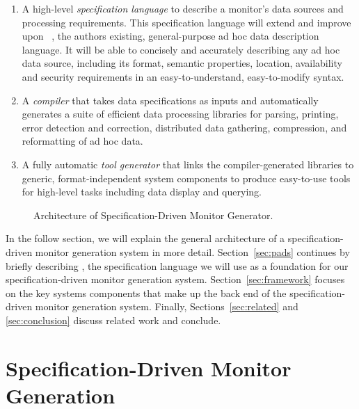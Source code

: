 \documentclass{sigplanconf}
\begin{document}
\begin{enumerate}

\item A high-level {\em specification language} to describe a monitor's
data sources and processing requirements.  
This specification language will extend and improve upon
\pads{}~\cite{fisher+:pads,fisher+:700,mandelbaum+:padsml}, the authors
existing, general-purpose ad hoc data description language.  
It will be able to
concisely and accurately describing any ad hoc data source,
including its format, semantic properties, location,
availability and security requirements in an easy-to-understand, easy-to-modify syntax.

\item A {\em compiler} that takes data specifications as inputs and
automatically generates a suite of 
efficient data processing libraries for parsing, printing, error detection
and correction, distributed data gathering, compression, and 
reformatting of ad hoc data.

\item A fully automatic {\em tool generator} that links the compiler-generated 
libraries to generic, format-independent system components to produce easy-to-use 
tools for high-level tasks including data display and querying.

\end{enumerate}

\begin{figure*}[t]
\begin{center}
\centerline{}
\end{center}
\caption{\label{fig:arch} Architecture of Specification-Driven Monitor Generator.
}
\end{figure*}

In the follow section, we will explain 
the general architecture of a specification-driven monitor generation system
in more detail.
Section~\ref{sec:pads} continues by briefly describing \pads{}, the specification language
we will use as a foundation for our specification-driven monitor generation system.
Section~\ref{sec:framework} focuses on the key systems components that make up the back end of
the specification-driven monitor generation system.  Finally,
Sections~\ref{sec:related} and \ref{sec:conclusion} discuss related work and
conclude.

\section{Specification-Driven Monitor Generation}
\label{sec:architecture}
\end{document}
